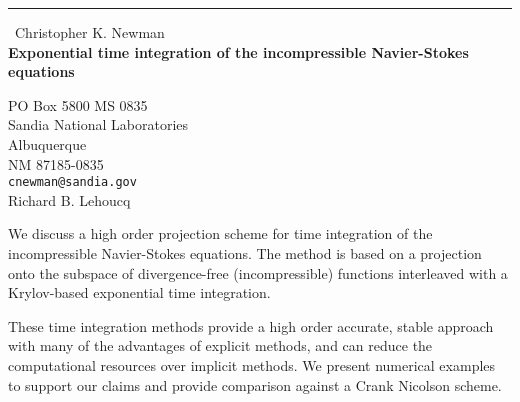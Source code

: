 \documentclass{report}
\begin{document}
\begin{center}
\rule{6in}{1pt} \
{\large Christopher K. Newman \\
{\bf Exponential time integration of the incompressible Navier-Stokes equations}}

PO Box 5800 MS 0835 \\ Sandia National Laboratories \\ Albuquerque \\ NM 87185-0835
\\
{\tt cnewman@sandia.gov}\\
Richard B. Lehoucq\end{center}

We discuss a high order projection scheme for time integration
of the incompressible Navier-Stokes equations.
The method is based on a projection onto the subspace of
divergence-free (incompressible) functions interleaved with
a Krylov-based exponential time integration.

These time integration methods provide a high order accurate,
stable approach with many of the advantages of explicit methods,
and can reduce the computational resources over implicit methods.
We present numerical examples to support our claims and provide
comparison against a Crank Nicolson scheme.
\end{document}
